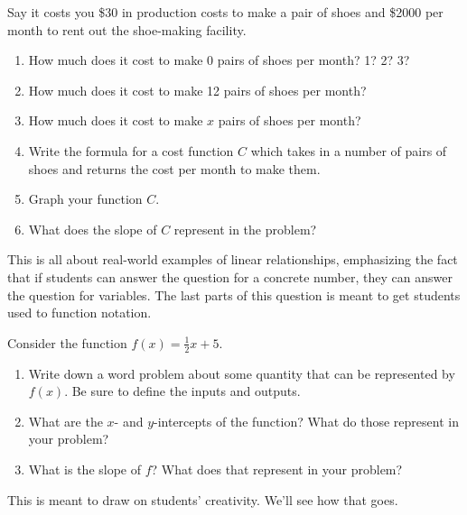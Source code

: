 \documentclass[noauthor,noinstructornotes]{ximera}
\begin{document}
\begin{problem}
Say it costs you \$30 in production costs to make a pair
of shoes and \$2000 per month to rent out the shoe-making
facility.

\begin{enumerate}
    \item How much does it cost to 
    make 0 pairs of shoes per month? 1? 2? 3? 
    \item How much does it cost to 
    make 12 pairs of shoes per month?
    \item How much does it cost to 
    make \(x\) pairs of shoes per month? 
    \item Write the formula for a cost function \(C\)
    which takes in a number of pairs of shoes and
    returns the cost per month to make them.
    \item Graph your function \(C\).
    \item What does the slope of \(C\) represent
    in the problem?
\end{enumerate}

\begin{instructorNotes}
This is all about real-world examples of linear relationships,
emphasizing the fact that if students can answer the question 
for a concrete number, they can answer the question for 
variables. The last parts of this question is meant to 
get students used to function notation. 
\end{instructorNotes}


\end{problem}

\begin{problem}
Consider the function \(f(x) = \frac{1}{2}x + 5\).

\begin{enumerate}
    \item Write down a word problem about some
    quantity that can be represented by \(f(x)\).
    Be sure to define the inputs and outputs.
    \item What are the \(x\)- and \(y\)-intercepts
    of the function? What do those represent
    in your problem?
    \item What is the slope of \(f\)? What does 
    that represent in your problem?
\end{enumerate}

\begin{instructorNotes}
This is meant to draw on students' creativity. We'll see how that goes.
\end{instructorNotes}
\end{problem}
\end{document}
